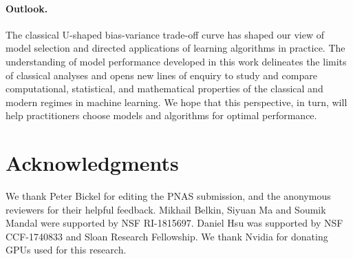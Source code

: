 \documentclass[11pt]{article}
\begin{document}
\paragraph{Outlook.}
The classical U-shaped bias-variance  trade-off curve has shaped our view of model selection and directed applications of learning algorithms in practice. The understanding of model performance developed in this work delineates the limits of classical analyses and opens new lines of enquiry
to study and compare computational, statistical, and mathematical properties of the classical and modern regimes in  machine learning. We hope that this perspective, in turn, will help practitioners choose models and algorithms for optimal performance.

\section*{Acknowledgments}
We thank Peter Bickel for editing the PNAS submission, and the anonymous reviewers for their helpful feedback. 
Mikhail Belkin, Siyuan Ma and Soumik Mandal were supported by NSF RI-1815697.
Daniel Hsu was supported by NSF CCF-1740833 and Sloan Research Fellowship. We thank Nvidia for donating GPUs used for this research.
\end{document}
